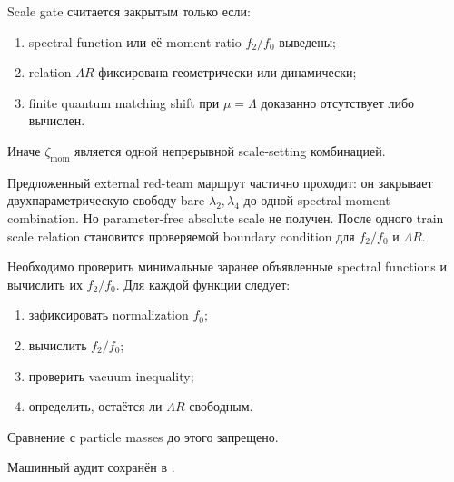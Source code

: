 \begin{nogocriterion}
Scale gate считается закрытым только если:
\begin{enumerate}
 \item spectral function или её moment ratio \(f_2/f_0\) выведены;
 \item relation \(\Lambda R\) фиксирована геометрически или динамически;
 \item finite quantum matching shift при \(\mu=\Lambda\) доказанно
 отсутствует либо вычислен.
\end{enumerate}
Иначе \(\zeta_{\mathrm{mom}}\) является одной непрерывной scale-setting
комбинацией.
\end{nogocriterion}

\begin{theorem}
Предложенный external red-team маршрут частично проходит: он закрывает
двухпараметрическую свободу bare \(\lambda_2,\lambda_4\) до одной
spectral-moment combination. Но parameter-free absolute scale не получен.
После одного train scale relation становится проверяемой boundary
condition для \(f_2/f_0\) и \(\Lambda R\).
\end{theorem}

\begin{protocol}
Необходимо проверить минимальные заранее объявленные spectral functions
и вычислить их \(f_2/f_0\). Для каждой функции следует:
\begin{enumerate}
 \item зафиксировать normalization \(f_0\);
 \item вычислить \(f_2/f_0\);
 \item проверить vacuum inequality;
 \item определить, остаётся ли \(\Lambda R\) свободным.
\end{enumerate}
Сравнение с particle masses до этого запрещено.
\end{protocol}

Машинный аудит сохранён в
.